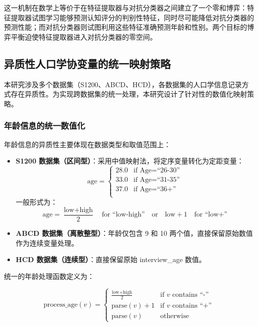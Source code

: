 \documentclass[UTF8, a4paper, 12pt]{article}
\begin{document}
这一机制在数学上等价于在特征提取器与对抗分类器之间建立了一个零和博弈：特征提取器试图学习能够预测认知评分的判别性特征，同时尽可能降低对抗分类器的预测性能；而对抗分类器则试图利用这些特征准确预测年龄和性别。两个目标的博弈平衡迫使特征提取器进入对抗分类器的零空间。

\subsection{异质性人口学协变量的统一映射策略}

本研究涉及多个数据集（S1200、ABCD、HCD），各数据集的人口学信息记录方式存在异质性。为实现跨数据集的统一处理，本研究设计了针对性的数值化映射策略。

\subsubsection{年龄信息的统一数值化}

年龄信息的异质性主要体现在数据类型和取值范围上：

\begin{itemize}
    \item \textbf{S1200 数据集（区间型）}：采用中值映射法，将定序变量转化为定距变量：
    \begin{equation}
    \text{age} = \begin{cases}
    28.0 & \text{if } \text{Age} = \text{``26-30''} \\
    33.0 & \text{if } \text{Age} = \text{``31-35''} \\
    37.0 & \text{if } \text{Age} = \text{``36+''} \\
    \end{cases}
    \end{equation}
    一般形式为：
    \begin{equation}
    \text{age} = \frac{\text{low} + \text{high}}{2} \quad \text{for } \text{``low-high''} \quad \text{or} \quad \text{low} + 1 \quad \text{for } \text{``low+''}
    \end{equation}

    \item \textbf{ABCD 数据集（离散整型）}：年龄仅包含 9 和 10 两个值，直接保留原始数值作为连续变量处理。

    \item \textbf{HCD 数据集（连续型）}：直接保留原始 interview\_age 数值。
\end{itemize}

统一的年龄处理函数定义为：

\begin{equation}
\text{process\_age}(v) = \begin{cases}
\frac{\text{low} + \text{high}}{2} & \text{if } v \text{ contains } \text{``-''} \\
\text{parse}(v) + 1 & \text{if } v \text{ contains } \text{``+''} \\
\text{parse}(v) & \text{otherwise}
\end{cases}
\end{equation}
\end{document}

